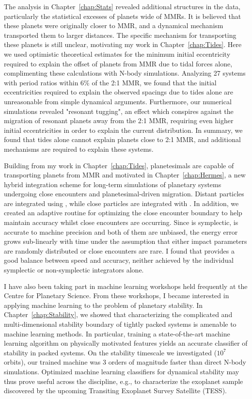 The analysis in Chapter~\ref{chap:Stats} revealed additional structures in the \kep data, particularly the statistical excesses of planets wide of MMRs.
It is believed that these planets were originally closer to MMR, and a dynamical mechanism transported them to larger distances.
The specific mechanism for transporting these planets is still unclear, motivating my work in Chapter~\ref{chap:Tides}.
Here we used optimistic theoretical estimates for the minimum initial eccentricity required to explain the offset of \kep planets from MMR due to tidal forces alone, complimenting these calculations with N-body simulations.
Analyzing 27 \kep systems with period ratios within $6\%$ of the 2:1 MMR, we found that the initial eccentricities required to explain the observed spacings due to tides alone are unreasonable from simple dynamical arguments.
Furthermore, our numerical simulations revealed "resonant tugging", an effect which conspires against the migration of resonant planets away from the 2:1 MMR, requiring even higher initial eccentricities in order to explain the current \kep distribution. 
In summary, we found that tides alone cannot explain planets close to 2:1 MMR, and additional mechanisms are required to explain these systems. 

Building from my work in Chapter~\ref{chap:Tides}, planetesimals are capable of transporting planets from MMR and motivated \hermes in Chapter~\ref{chap:Hermes}, a new hybrid integration scheme for long-term simulations of planetary systems undergoing close encounters and planetesimal-driven migration. 
Distant particles are integrated using \whfast, while close particles are integrated with \ias.
In addition, we created an adaptive routine for optimizing the close encounter boundary to help maintain accuracy whilst close encounters are occurring.
Since \whfast is symplectic, \ias is accurate to machine precision and both of them are unbiased, the energy error grows sub-linearly with time under the assumption that either impact parameters are randomly distributed or close encounters are rare.
I found that \hermes provides a good balance between speed and accuracy, neither achieved by the individual symplectic or non-symplectic integrators alone.

I have also been taking part in machine learning workshops held frequently at the Centre for Planetary Science. 
From these workshops, I became interested in applying machine learning to the problem of planetary stability. 
In Chapter~\ref{chap:Stability}, we showed that characterizing the complicated and multi-dimensional stability boundary of tightly packed systems is amenable to machine learning methods. 
In particular, training a state-of-the-art machine learning algorithm on physically motivated features yields an accurate classifier of stability in packed systems. 
On the stability timescale we investigated ($10^7$ orbits), our trained machine was 3 orders of magnitude faster than direct N-body simulations. 
Optimized machine learning classifiers for dynamical stability may thus prove useful across the discipline, e.g., to characterize the exoplanet sample discovered by the upcoming Transiting Exoplanet Survey Satellite (TESS).

